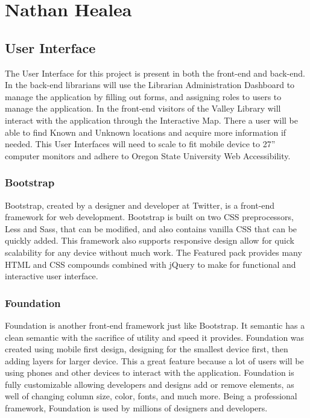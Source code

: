 \documentclass[letterpaper,10pt,titlepage, onecolumn, compsoc]{IEEEtran}
\begin{document}
\section{Nathan Healea}

\subsection{User Interface}
The User Interface for this project is present in both the front-end and back-end. In the back-end librarians will use the Librarian Administration Dashboard to manage the application by filling out forms, and assigning roles to users to manage the application. In the front-end visitors of the Valley Library will interact with the application through the Interactive Map. There a user will be able to find Known and Unknown locations and acquire more information if needed. This User Interfaces will need to scale to fit mobile device to 27” computer monitors and adhere to Oregon State University Web Accessibility. 

\subsubsection{Bootstrap}
Bootstrap, created by a designer and developer at Twitter, is a front-end framework for web development. Bootstrap is built on two CSS preprocessors, Less and Sass, that can be modified, and also contains vanilla CSS that can be quickly added. This framework also supports responsive design allow for quick scalability for any device without much work. The Featured pack provides many HTML and CSS compounds combined with jQuery to make for functional and interactive user interface. \cite{bootstrap2016}

\subsubsection{Foundation}
Foundation is another front-end framework just like Bootstrap. It semantic has a clean semantic with the sacrifice of utility and speed it provides. Foundation was created using mobile first design, designing for the smallest device first, then adding layers for larger device. This a great feature because a lot of users will be using phones and other devices to interact with the application. Foundation is fully customizable allowing developers and designs add or remove elements, as well of changing column size, color, fonts, and much more. Being a professional framework, Foundation is used by millions of designers and developers. \cite{foundation2016}
\end{document}
